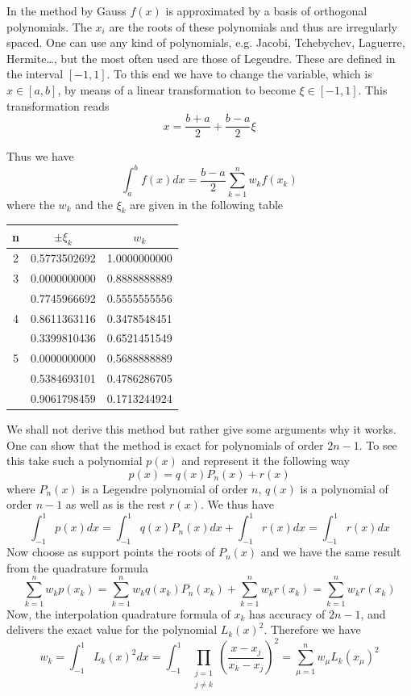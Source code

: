 In the method by Gauss $f(x)$ is approximated by a basis of orthogonal
polynomials. The $x_i$ are the roots of these polynomials and thus are
irregularly spaced. One can use any kind of polynomials, e.g. Jacobi,
Tchebychev, Laguerre, Hermite\dots, but the most often used are those of
Legendre. These are defined in the interval $[-1,1]$. To this end we have to
change the variable, which is $x\in[a,b]$, by means of a linear transformation
to become $\xi\in[-1,1]$. This transformation reads
\[x=\frac{b+a}{2}+\frac{b-a}{2}\xi \]

Thus we have
\[\int_a^bf(x)dx=\frac{b-a}{2}\sum_{k=1}^{n}w_kf(x_k)\]
where the $w_k$ and the $\xi_k$ are given in the following table
\begin{center}
\begin{tabular}{|c|c|c|}
\hline
n&$\pm\xi_k$&$w_k$\\\hline
2&0.5773502692&1.0000000000\\\hline
3&0.0000000000&0.8888888889\\
 &0.7745966692&0.5555555556\\\hline
4&0.8611363116&0.3478548451\\
 &0.3399810436&0.6521451549\\\hline
5&0.0000000000&0.5688888889\\
 &0.5384693101&0.4786286705\\
 &0.9061798459&0.1713244924\\\hline
\end{tabular}
\end{center}

We shall not derive this method but rather give some arguments why it works.
One can show that the method is exact for polynomials of order $2n-1$. To see
this take such a polynomial $p(x)$ and represent it the following way
\[ p(x)=q(x)P_n(x) +r(x)\]
where $P_n(x)$ is a Legendre polynomial of order $n$, $q(x)$ is a polynomial of
order $n-1$ as well as is the rest $r(x)$. 
We thus have
\[ \int_{-1}^1p(x)dx=\int_{-1}^1q(x) P_n(x) dx+\int_{-1}^1r(x)dx=\int_{-1}^1r(x)dx\]
Now choose as support points the roots of $P_n(x)$ and we have the same result
from the quadrature formula
\[ \sum_{k=1}^nw_kp(x_k)=\sum_{k=1}^nw_kq(x_k)P_n(x_k)
+\sum_{k=1}^nw_kr(x_k)=\sum_{k=1}^nw_kr(x_k)\]
Now, the interpolation quadrature
formula of $x_k$ has accuracy of $2n-1$, and delivers the exact value for the
polynomial $L_k(x)^2$. Therefore we have
\[ w_k=\int_{-1}^1L_k(x)^2dx=\int_{-1}^1\prod_{\substack{j=1\\ j\neq
k}}\left(\frac{x-x_j}{x_k-x_j}\right)^2=\sum_{\mu=1}^nw_\mu L_k(x_\mu)^2\]

